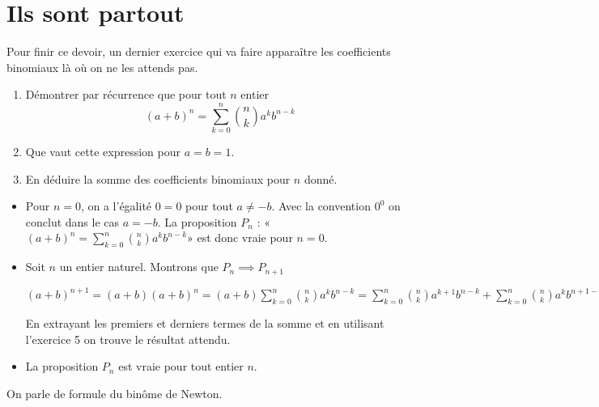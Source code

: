 \documentclass[12pt,a4paper,french]{article}
\theoremstyle{break}
\theoremstyle{plain}
\theoremstyle{nonumberplain}
\theoremstyle{nonumberbreak}
\begin{document}
\section{Ils sont partout}

Pour finir ce devoir, un dernier exercice qui va faire apparaître les
coefficients binomiaux là où on ne les attends pas.

\begin{question}[ID=Newton]
  \begin{enumerate}
    \item Démontrer par récurrence que pour tout $n$ entier \[ (a + b)^n
      = \sum_{k = 0}^n \binom{n}{k} a^k b^{n - k} \]
    \item Que vaut cette expression pour $a = b = 1$.
    \item En déduire la somme des coefficients binomiaux pour $n$ donné.
  \end{enumerate}
\end{question}
\begin{solution}
  \begin{itemize}
    \item Pour $n =0$, on a l'égalité $0=0$ pour tout $a \neq -b$. Avec
      la convention $0^0$ on conclut dans le cas $a = -b$. La
      proposition $P_n$ : «$(a + b)^n = \sum_{k = 0}^n \binom{n}{k} a^k
      b^{n - k}$» est donc vraie pour $n =0$.
    \item Soit $n$ un entier naturel. Montrons que $P_n \implies
      P_{n+1}$

      $(a + b)^{n+1} = (a+b)(a + b)^n = (a+b)\sum_{k = 0}^n \binom{n}{k}
      a^k b^{n - k} = \sum_{k = 0}^n \binom{n}{k}a^{k+1}b^{n - k} +
      \sum_{k = 0}^n \binom{n}{k}a^k b^{n+1 - k}$

      En extrayant les premiers et derniers termes de la somme et
      en utilisant l'exercice 5 on trouve le résultat attendu.
    \item La proposition $P_n$ est vraie pour tout entier $n$.
  \end{itemize}
  On parle de formule du binôme de Newton.
\end{solution}
\end{document}
